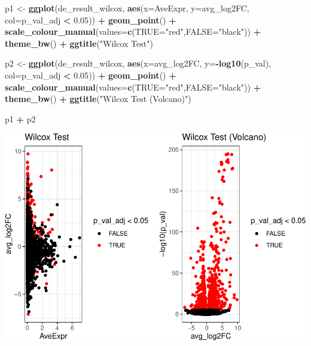 \documentclass[
]{book}
\newenvironment{Shaded}{\begin{snugshade}}{\end{snugshade}}
\newcommand{\AttributeTok}[1]{\textcolor[rgb]{0.13,0.29,0.53}{#1}}
\newcommand{\FloatTok}[1]{\textcolor[rgb]{0.00,0.00,0.81}{#1}}
\newcommand{\FunctionTok}[1]{\textcolor[rgb]{0.13,0.29,0.53}{\textbf{#1}}}
\newcommand{\NormalTok}[1]{#1}
\newcommand{\OtherTok}[1]{\textcolor[rgb]{0.56,0.35,0.01}{#1}}
\newcommand{\SpecialCharTok}[1]{\textcolor[rgb]{0.81,0.36,0.00}{\textbf{#1}}}
\newcommand{\StringTok}[1]{\textcolor[rgb]{0.31,0.60,0.02}{#1}}
\begin{document}
\begin{Shaded}
\begin{Highlighting}[]
\NormalTok{p1 }\OtherTok{\textless{}{-}} \FunctionTok{ggplot}\NormalTok{(de\_result\_wilcox, }\FunctionTok{aes}\NormalTok{(}\AttributeTok{x=}\NormalTok{AveExpr, }\AttributeTok{y=}\NormalTok{avg\_log2FC, }\AttributeTok{col=}\NormalTok{p\_val\_adj }\SpecialCharTok{\textless{}} \FloatTok{0.05}\NormalTok{)) }\SpecialCharTok{+}
  \FunctionTok{geom\_point}\NormalTok{() }\SpecialCharTok{+}
  \FunctionTok{scale\_colour\_manual}\NormalTok{(}\AttributeTok{values=}\FunctionTok{c}\NormalTok{(}\StringTok{\textquotesingle{}TRUE\textquotesingle{}}\OtherTok{=}\StringTok{"red"}\NormalTok{,}\StringTok{\textquotesingle{}FALSE\textquotesingle{}}\OtherTok{=}\StringTok{"black"}\NormalTok{)) }\SpecialCharTok{+} 
  \FunctionTok{theme\_bw}\NormalTok{() }\SpecialCharTok{+}
  \FunctionTok{ggtitle}\NormalTok{(}\StringTok{"Wilcox Test"}\NormalTok{)}


\NormalTok{p2 }\OtherTok{\textless{}{-}} \FunctionTok{ggplot}\NormalTok{(de\_result\_wilcox, }\FunctionTok{aes}\NormalTok{(}\AttributeTok{x=}\NormalTok{avg\_log2FC, }\AttributeTok{y=}\SpecialCharTok{{-}}\FunctionTok{log10}\NormalTok{(p\_val), }\AttributeTok{col=}\NormalTok{p\_val\_adj }\SpecialCharTok{\textless{}} \FloatTok{0.05}\NormalTok{)) }\SpecialCharTok{+}
  \FunctionTok{geom\_point}\NormalTok{() }\SpecialCharTok{+}
  \FunctionTok{scale\_colour\_manual}\NormalTok{(}\AttributeTok{values=}\FunctionTok{c}\NormalTok{(}\StringTok{\textquotesingle{}TRUE\textquotesingle{}}\OtherTok{=}\StringTok{"red"}\NormalTok{,}\StringTok{\textquotesingle{}FALSE\textquotesingle{}}\OtherTok{=}\StringTok{"black"}\NormalTok{)) }\SpecialCharTok{+} 
  \FunctionTok{theme\_bw}\NormalTok{() }\SpecialCharTok{+}
  \FunctionTok{ggtitle}\NormalTok{(}\StringTok{"Wilcox Test (Volcano)"}\NormalTok{)}

\NormalTok{p1 }\SpecialCharTok{+}\NormalTok{ p2}
\end{Highlighting}
\end{Shaded}

\includegraphics{scRNAseqInR_ABACBS_2024_Doco_files/figure-latex/unnamed-chunk-51-1.pdf}
\end{document}
